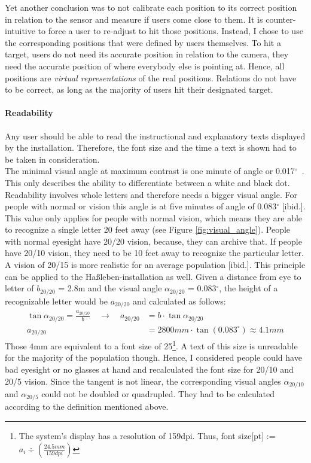 Yet another conclusion was to not calibrate each position to its correct position in relation to the sensor and measure if users come close to them. It is counter-intuitive to force a user to re-adjust to hit those positions. Instead, I chose to use the corresponding positions that were defined by users themselves. To hit a target, users do not need its accurate position in relation to the camera, they need the accurate position of where everybody else is pointing at. Hence, all positions are \textit{virtual representations} of the real positions. Relations do not have to be correct, as long as the majority of users hit their designated target.


\paragraph{Readability} Any user should be able to read the instructional and explanatory texts displayed by the installation. Therefore, the font size and the time a text is shown had to be taken in consideration.
\\
The minimal visual angle at maximum contrast is one minute of angle or 0.017$^\circ$~\cite{SehwinkelLesbarkeit}. This only describes the ability to differentiate between a white and black dot. Readability involves whole letters and therefore needs a bigger visual angle. For people with normal or vision this angle is at five minutes of angle of 0.083$^\circ$ [ibid.]. This value only applies for people with normal vision, which means they are able to recognize a single letter 20 feet away (see Figure \ref{fig:visual_angle}). People with normal eyesight have 20/20 vision, because, they can archive that. If people have 20/10 vision, they need to be 10 feet away to recognize the particular letter. A vision of 20/15 is more realistic for an average population [ibid.]. This principle can be applied to the Haßleben-installation as well. Given a distance from eye to letter of $b_{20/20}$ = 2.8m and the visual angle $\alpha_{20/20}$ = 0.083$^\circ$, the height of a recognizable letter would be $a_{20/20}$ and calculated as follows:
\begin{align*}
	\tan{\alpha_{20/20}} = \frac{a_{20/20}}{b} \quad \to \quad a_{20/20} &= b \cdot \tan{\alpha_{20/20}}
	\\
	a_{20/20} &= 2800mm \cdot \tan{(0.083^\circ)} \approx 4.1mm
\end{align*}
Those 4mm are equivalent to a font size of 25\footnote{The system's display has a resolution of 159dpi. Thus, font size[pt] := $a_{i} \div{(\frac{24.5mm}{159dpi})}$}. A text of this size is unreadable for the majority of the population though. Hence, I considered people could have bad eyesight or no glasses at hand and recalculated the font size for 20/10 and 20/5 vision. Since the tangent is not linear, the corresponding visual angles $\alpha_{20/10}$ and $\alpha_{20/5}$ could not be doubled or quadrupled. They had to be calculated according to the definition mentioned above.
